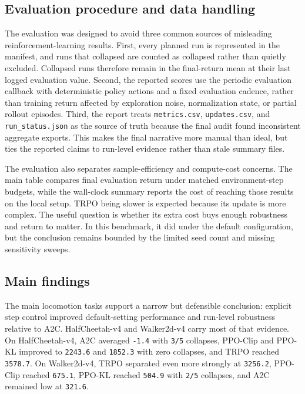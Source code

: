 \documentclass{article}
\begin{document}
\subsection{Evaluation procedure and data handling}

The evaluation was designed to avoid three common sources of misleading reinforcement-learning results. First, every planned run is represented in the manifest, and runs that collapsed are counted as collapsed rather than quietly excluded. Collapsed runs therefore remain in the final-return mean at their last logged evaluation value. Second, the reported scores use the periodic evaluation callback with deterministic policy actions and a fixed evaluation cadence, rather than training return affected by exploration noise, normalization state, or partial rollout episodes. Third, the report treats \texttt{metrics.csv}, \texttt{updates.csv}, and \texttt{run\_status.json} as the source of truth because the final audit found inconsistent aggregate exports. This makes the final narrative more manual than ideal, but ties the reported claims to run-level evidence rather than stale summary files.

The evaluation also separates sample-efficiency and compute-cost concerns. The main table compares final evaluation return under matched environment-step budgets, while the wall-clock summary reports the cost of reaching those results on the local setup. TRPO being slower is expected because its update is more complex. The useful question is whether its extra cost buys enough robustness and return to matter. In this benchmark, it did under the default configuration, but the conclusion remains bounded by the limited seed count and missing sensitivity sweeps.

\subsection{Main findings}

The main locomotion tasks support a narrow but defensible conclusion: explicit step control improved default-setting performance and run-level robustness relative to A2C. HalfCheetah-v4 and Walker2d-v4 carry most of that evidence. On HalfCheetah-v4, A2C averaged \texttt{-1.4} with \texttt{3/5} collapses, PPO-Clip and PPO-KL improved to \texttt{2243.6} and \texttt{1852.3} with zero collapses, and TRPO reached \texttt{3578.7}. On Walker2d-v4, TRPO separated even more strongly at \texttt{3256.2}, PPO-Clip reached \texttt{675.1}, PPO-KL reached \texttt{504.9} with \texttt{2/5} collapses, and A2C remained low at \texttt{321.6}.
\end{document}

